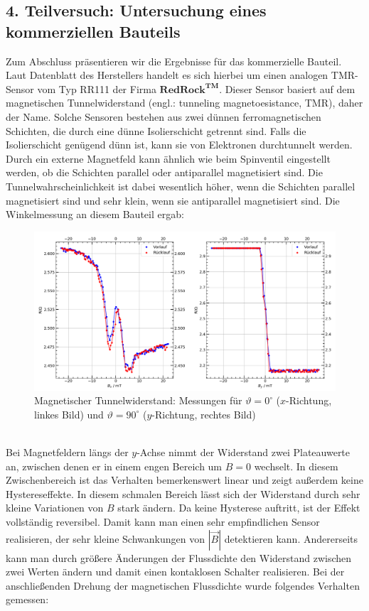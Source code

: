 \documentclass[german,  %
parskip=full,  %
]{scrartcl}
\begin{document}
\subsection{4. Teilversuch: Untersuchung eines kommerziellen Bauteils}
Zum Abschluss präsentieren wir die Ergebnisse für das kommerzielle Bauteil. Laut Datenblatt des Herstellers handelt es sich hierbei um einen analogen TMR-Sensor vom Typ RR111 der Firma \(\textbf{RedRock}^{\textbf{TM}}\). Dieser Sensor basiert auf dem magnetischen Tunnelwiderstand (engl.: tunneling magnetoesistance, TMR), daher der Name. Solche Sensoren bestehen aus zwei dünnen ferromagnetischen Schichten, die durch eine dünne Isolierschicht getrennt sind. Falls die Isolierschicht genügend dünn ist, kann sie von Elektronen durchtunnelt werden. Durch ein externe Magnetfeld kann ähnlich wie beim Spinventil eingestellt werden, ob die Schichten parallel oder antiparallel magnetisiert sind. Die Tunnelwahrscheinlichkeit ist dabei wesentlich höher, wenn die Schichten parallel magnetisiert sind und sehr klein, wenn sie antiparallel magnetisiert sind. Die Winkelmessung an diesem Bauteil ergab: \\
\begin{figure}[h!]\centering
\includegraphics[width=\textwidth]{Probe4_0_und_90_Grad.png}
\caption{Magnetischer Tunnelwiderstand: Messungen für \(\vartheta=0^{\circ}\) (\(x\)-Richtung, linkes Bild) und \(\vartheta=90^{\circ}\)  (\(y\)-Richtung, rechtes Bild)}
\end{figure} \\
Bei Magnetfeldern längs der \(y\)-Achse nimmt der Widerstand zwei Plateauwerte an, zwischen denen er in einem engen Bereich um \(B=0\) wechselt. In diesem Zwischenbereich ist das Verhalten bemerkenswert linear und zeigt außerdem keine Hystereseffekte. In diesem schmalen Bereich lässt sich der Widerstand durch sehr kleine Variationen von \(B\) stark ändern. Da keine Hysterese auftritt, ist der Effekt vollständig reversibel. Damit kann man einen sehr empfindlichen Sensor realisieren, der sehr kleine Schwankungen von \(|\vec{B}|\) detektieren kann. Andererseits kann man durch größere Änderungen der Flussdichte den Widerstand zwischen zwei Werten ändern und damit einen kontaklosen Schalter realisieren. Bei der anschließenden Drehung der magnetischen Flussdichte wurde folgendes Verhalten gemessen:\\
\end{document}
